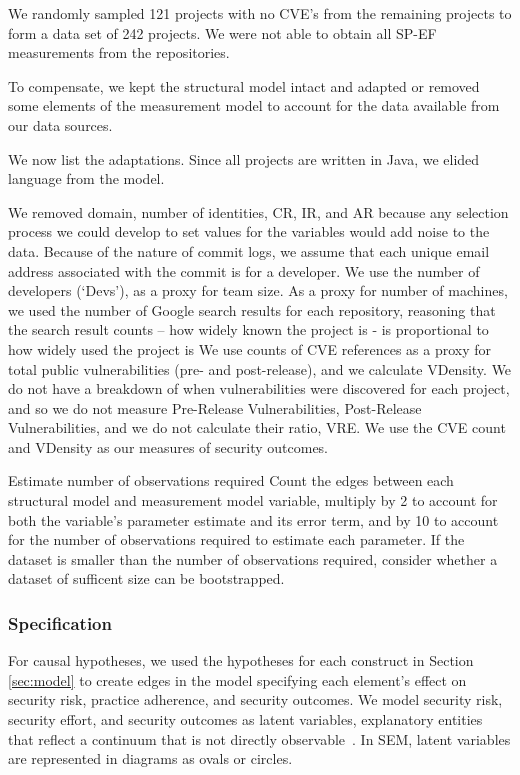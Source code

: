 We randomly sampled 121 projects with no CVE’s from the remaining projects to form a data set of 242 projects.
We were not able to obtain all SP-EF measurements from the repositories. 

To compensate, we kept the structural model intact and adapted or removed some elements of the measurement model to account for the data available from our data sources. 

We now list the adaptations. Since all projects are written in Java, we elided language from the model. 

We removed domain, number of identities, CR, IR, and AR because any selection process we could develop to set values for the variables would add noise to the data. Because of the nature of commit logs, we assume that each unique email address associated with the commit is for a developer. We use the number of developers (‘Devs’), as a proxy for team size. As a proxy for number of machines, we used the number of Google  search results for each repository, reasoning that the search result counts – how widely known the project is - is proportional to how widely used the project is We use counts of CVE references as a proxy for total public vulnerabilities (pre- and post-release), and we calculate VDensity. We do not have a breakdown of when vulnerabilities were discovered for each project, and so we do not measure Pre-Release Vulnerabilities, Post-Release Vulnerabilities, and we do not calculate their ratio, VRE. We use the CVE count and VDensity as our measures of security outcomes. 


\item Estimate number of observations required
Count the edges between each structural model and measurement model variable, multiply by 2 to account for both the variable's parameter estimate and its error term, and by 10 to account for the number of observations required to estimate each parameter. If the dataset is smaller than the number of observations required, consider whether a dataset of sufficent size can be bootstrapped.


\subsubsection{Specification}
For causal hypotheses, we used the hypotheses for each construct in Section \ref{sec:model} to create edges in the model specifying each element’s effect on security risk, practice adherence, and security outcomes.  We model security risk, security effort, and security outcomes as latent variables, explanatory entities that reflect a continuum that is not directly observable~\cite{kline2015principles}. In SEM, latent variables are represented in diagrams as ovals or circles.

